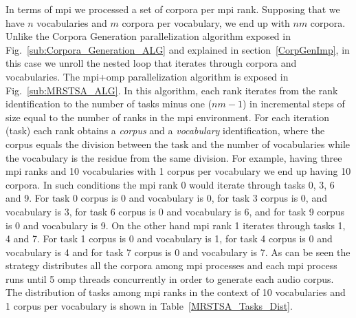 {In terms of \gls{mpi} we processed a set of corpora per \gls{mpi} rank. Supposing that we have $n$ vocabularies and $m$ corpora per vocabulary, we end up with $n m$ corpora. Unlike the Corpora Generation parallelization algorithm exposed in Fig.~\ref{sub:Corpora_Generation_ALG} and explained in section~\ref{CorpGenImp}, in this case we unroll the nested loop that iterates through corpora and vocabularies. The \gls{mpi}+\gls{omp} parallelization algorithm is exposed in Fig.~\ref{sub:MRSTSA_ALG}. In this algorithm, each rank iterates from the rank identification to the number of tasks minus one ($n m - 1$) in incremental steps of size equal to the number of ranks in the \gls{mpi} environment. For each iteration (task) each rank obtains a \emph{corpus} and a \emph{vocabulary} identification, where the corpus equals the division between the task and the number of vocabularies while the vocabulary is the residue from the same division. For example, having three \gls{mpi} ranks and 10 vocabularies with 1 corpus per vocabulary we end up having 10 corpora. In such conditions the \gls{mpi} rank 0 would iterate through tasks 0, 3, 6 and 9. For task 0 corpus is 0 and vocabulary is 0, for task 3 corpus is 0, and vocabulary is 3, for task 6 corpus is 0 and vocabulary is 6, and for task 9 corpus is 0 and vocabulary is 9. On the other hand \gls{mpi} rank 1 iterates through tasks 1, 4 and 7. For task 1 corpus is 0 and vocabulary is 1, for task 4 corpus is 0 and vocabulary is 4 and for task 7 corpus is 0 and vocabulary is 7. As can be seen the strategy distributes all the corpora among \gls{mpi} processes and each \gls{mpi} process runs until 5 \gls{omp} threads concurrently in order to generate each audio corpus. The distribution of tasks among \gls{mpi} ranks in the context of 10 vocabularies and 1 corpus per vocabulary is shown in Table~\ref{MRSTSA_Tasks_Dist}. 

}
